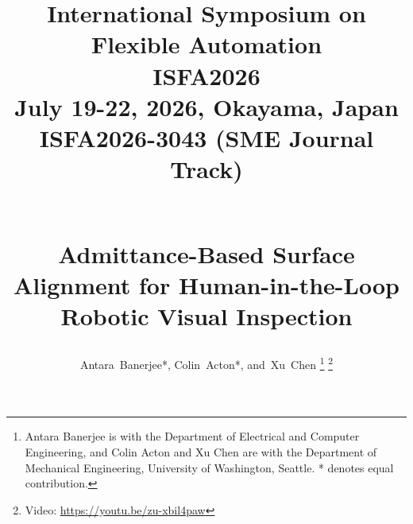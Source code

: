 \documentclass[journal]{IEEEtran}
\begin{document}
%

\title{
  \hfill\parbox{\textwidth}{\raggedleft
    \normalsize %
    International Symposium on Flexible Automation \\
    ISFA2026 \\
    July 19-22, 2026, Okayama, Japan \\[10pt]
    \Large \textbf{ISFA2026-3043 (SME Journal Track)}
  }\\[2em] %
  Admittance-Based Surface Alignment for Human-in-the-Loop Robotic Visual Inspection
}
%
%
%

\author{Antara~Banerjee*,
        Colin~Acton*,
        and~Xu~Chen%
\thanks{Antara Banerjee is with the Department
of Electrical and Computer Engineering, and Colin Acton and Xu Chen are with the Department of Mechanical Engineering, University of Washington, Seattle. * denotes equal contribution.}
\thanks{Video: \url{https://youtu.be/zu-xbil4paw}}}

% 
%
\end{document}
